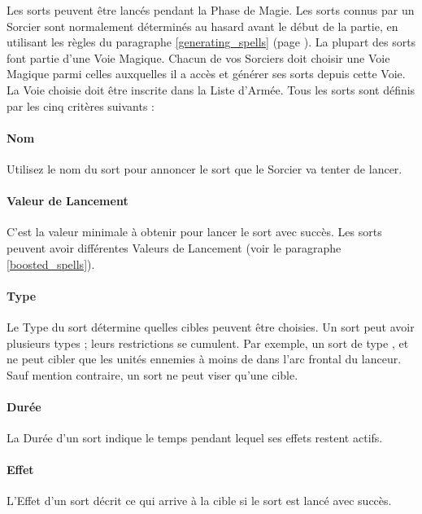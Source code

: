 Les sorts peuvent être lancés pendant la Phase de Magie. Les sorts connus par un Sorcier sont normalement déterminés au hasard avant le début de la partie, en utilisant les règles du paragraphe \ref{generating_spells} (page \pageref{generating_spells}). La plupart des sorts font partie d'une Voie Magique. Chacun de vos Sorciers doit choisir une Voie Magique parmi celles auxquelles il a accès et générer ses sorts depuis cette Voie. La Voie choisie doit être inscrite dans la Liste d'Armée. Tous les sorts sont définis par les cinq critères suivants :

\paragraph{Nom} 

Utilisez le nom du sort pour annoncer le sort que le Sorcier va tenter de lancer.

\paragraph{Valeur de Lancement} 

C'est la valeur minimale à obtenir pour lancer le sort avec succès. Les sorts peuvent avoir différentes Valeurs de Lancement (voir le paragraphe \ref{boosted_spells}).

\paragraph{Type}

Le Type du sort détermine quelles cibles peuvent être choisies. Un sort peut avoir plusieurs types ; leurs restrictions se cumulent. Par exemple, un sort de type , \hex{} et \direct{} ne peut cibler que les unités ennemies à moins de  dans l'arc frontal du lanceur. Sauf mention contraire, un sort ne peut viser qu'une cible.

\paragraph{Durée}

La Durée d'un sort indique le temps pendant lequel ses effets restent actifs.

\paragraph{Effet}

L'Effet d'un sort décrit ce qui arrive à la cible si le sort est lancé avec succès. 

